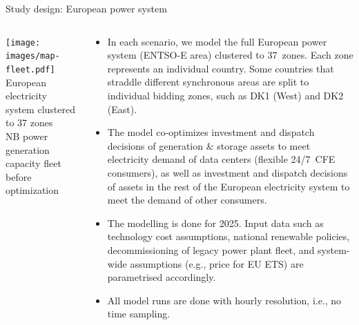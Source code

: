 \begin{frame}{Study design: European power system}
  
  {\footnotesize
  \begin{columns}[T]

  \begin{column}{7cm}
  \centering

  \vspace{0.6cm}
  \texttt{[image: images/map-fleet.pdf]}
  {\scriptsize European electricity system clustered to 37 zones \\ 
  NB power generation capacity fleet before optimization}
  \end{column}

  \begin{column}{8cm}
  \begin{itemize}
  \vspace{-0.2cm}
  \item In each scenario, we model the full European power system (ENTSO-E area) 
  clustered to \alert{37~zones}. Each zone represents an individual country. Some countries
  that straddle different synchronous areas are split to individual bidding zones, 
  such as DK1 (West) and DK2 (East).

  \item The model \alert{co-optimizes} investment and dispatch decisions of generation \& storage assets to meet electricity demand of data centers (flexible 24/7~CFE consumers), as well as investment and dispatch decisions of assets in the rest of the European electricity system to meet the demand of other consumers. 
  
  \item The modelling is done for \alert{2025}. Input data such as technology cost assumptions,
  national renewable policies, decommissioning of legacy power plant fleet, and system-wide assumptions (e.g., price for EU ETS) are parametrised accordingly.

  \item All model runs are done with \alert{hourly resolution}, i.e., no time sampling.
  
  \end{itemize}

  \end{column}
  \end{columns}
  }

\end{frame}



